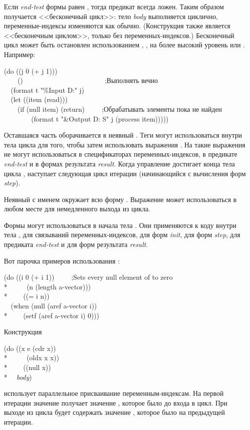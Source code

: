 \begin{defmac}
Если \emph{end-test} формы  равен \cd{{\false}}, тогда предикат всегда
ложен.
Таким образом получается <<бесконечный цикл>>:
тело \emph{body}  выполняется циклично, переменные-индексы изменяются
как обычно. (Конструкция  также является <<бесконечным циклом>>,
только без переменных-индексов.)
Бесконечный цикл может быть остановлен использованием ,
,  на более высокий уровень или .
Например:
\begin{lisp}
(do ((j 0 (+ j 1))) \\
~~~~({\false})~~~~~~~~~~~~~~~~~~~~~~~~;\textrm{Выполнять вечно} \\
~~(format t "{\Xtilde}\%Input {\Xtilde}D:" j) \\
~~(let ((item (read))) \\
~~~~(if (null item) (return)~~~~~;\textrm{Обрабатывать элементы пока не найден {\false}} \\
~~~~~~~~(format t "{\Xtilde}\&Output {\Xtilde}D: {\Xtilde}S" j (process item)))))
\end{lisp}

Оставшаяся часть  оборачивается в неявный .
Теги могут использоваться внутри тела цикла  для того, чтобы затем
использовать выражения . На такие выражения  не могут
использоваться в спецификаторах переменных-индексов, в предикате
\emph{end-test} и в формах результата \emph{result}.
Когда управление достигает конца тела цикла , наступает следующая
цикл итерации (начинающийся с вычисления форм \emph{step}).

Неявный  с именем {\nil} окружает всю форму .
Выражение  может использоваться в любом месте для немедленного
выхода из цикла.

Формы  могут использоваться в начала тела .
Они применяются к коду внутри тела , для связываний переменных-индексов,
для форм \emph{init}, для форм \emph{step}, для предиката \emph{end-test} и для
форм результата \emph{result}.

Вот парочка примеров использования :
\begin{lisp}
(do ((i 0 (+ i 1))~~~~~;\textrm{Sets every null element of  to zero} \\*
~~~~~(n (length a-vector))) \\*
~~~~((= i n)) \\
~~(when (null (aref a-vector i)) \\*
~~~~(setf (aref a-vector i) 0)))
\end{lisp}
Конструкция
\begin{lisp}
(do ((x e (cdr x)) \\*
~~~~~(oldx x x)) \\*
~~~~((null x)) \\*
~~\emph{body})
\end{lisp}
использует параллельное присваивание переменным-индексам. На первой итерации
значение  получает значение , которое было до входа в цикл.
При выходе из цикла  будет содержать значение , которое было на
предыдущей итерации.


\end{defmac}

